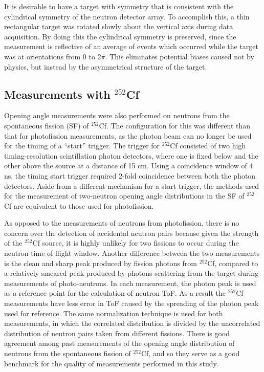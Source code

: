 It is desirable to have a target with symmetry that is consistent with the cylindrical symmetry of the neutron detector array.
To accomplish this, a thin rectangular target was rotated slowly about the vertical axis during data acquisition.
By doing this the cylindrical symmetry is preserved, since the measurement is reflective of an average of events which occurred while the target was at orientations from 0 to 2$\pi$.
This eliminates potential biases caused not by physics, but instead by the asymmetrical structure of the target.

\subsection{Measurements with $^{252}$Cf}

Opening angle measurements were also performed on neutrons from the spontaneous fission (SF) of $^{252}$Cf.
The configuration for this was different than that for photofission measurements, as the photon beam can no longer be used for the timing of a ``start'' trigger.
The trigger for $^{252}$Cf consisted of two high timing-resolution scintillation photon detectors, where one is fixed below and the other above the source at a distance of 15 cm.
Using a coincidence window of 4 ns, the timing start trigger required 2-fold coincidence between both the photon detectors.
Aside from a different mechanism for a start trigger, the methods used for the measurement of two-neutron opening angle distributions in the SF of $^{252}$Cf are equivalent to those used for photofission.

As opposed to the measurements of neutrons from photofission, there is no concern over the detection of accidental neutron pairs because given the strength of the $^{252}$Cf source, it is highly unlikely for two fissions to occur during the neutron time of flight window.
Another difference between the two measurements is the clean and sharp peak produced by fission photons from $^{252}$Cf, compared to a relatively smeared peak produced by photons scattering from the target during measurements of photo-neutrons.
In each measurement, the photon peak is used as a reference point for the calculation of neutron ToF.
As a result the $^{252}$Cf measurements have less error in ToF caused by the spreading of the photon peak used for reference.
The same normalization technique is used for both measurements, in which the correlated distribution is divided by the uncorrelated distribution of neutron pairs taken from different fissions.
There is good agreement among past measurements of the opening angle distribution of neutrons from the spontaneous fission of $^{252}$Cf, and so they serve as a good benchmark for the quality of measurements performed in this study.


